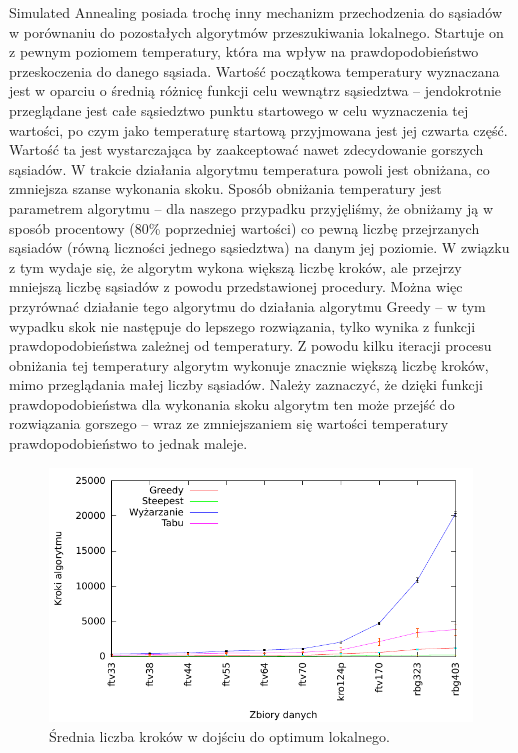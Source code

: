 Simulated Annealing posiada trochę inny mechanizm przechodzenia do sąsiadów w porównaniu do pozostałych algorytmów przeszukiwania lokalnego. Startuje on z pewnym poziomem temperatury, która ma wpływ na prawdopodobieństwo przeskoczenia do danego sąsiada. Wartość początkowa temperatury wyznaczana jest w oparciu o średnią różnicę funkcji celu wewnątrz sąsiedztwa -- jendokrotnie przeglądane jest całe sąsiedztwo punktu startowego w celu wyznaczenia tej wartości, po czym jako temperaturę startową przyjmowana jest jej czwarta część. Wartość ta jest wystarczająca by zaakceptować nawet zdecydowanie gorszych sąsiadów. W trakcie działania algorytmu temperatura powoli jest obniżana, co zmniejsza szanse wykonania skoku. Sposób obniżania temperatury jest parametrem algorytmu -- dla naszego przypadku przyjęliśmy, że obniżamy ją w sposób procentowy (80\% poprzedniej wartości) co pewną liczbę przejrzanych sąsiadów (równą liczności jednego sąsiedztwa) na danym jej poziomie. W związku z tym wydaje się, że algorytm wykona większą liczbę kroków, ale przejrzy mniejszą liczbę sąsiadów z powodu przedstawionej procedury. Można więc przyrównać działanie tego algorytmu do działania algorytmu Greedy -- w tym wypadku skok nie następuje do lepszego rozwiązania, tylko wynika z funkcji prawdopodobieństwa zależnej od temperatury. Z powodu kilku iteracji procesu obniżania tej temperatury algorytm wykonuje znacznie większą liczbę kroków, mimo przeglądania małej liczby sąsiadów. Należy zaznaczyć, że dzięki funkcji prawdopodobieństwa dla wykonania skoku algorytm ten może przejść do rozwiązania gorszego -- wraz ze zmniejszaniem się wartości temperatury prawdopodobieństwo to jednak maleje.

\begin{figure}[!h]
\centering\includegraphics[width=12cm]{img/loc_skoki}
\caption{Średnia liczba kroków w dojściu do optimum lokalnego.}\label{rys:loc_skoki}
\end{figure}

